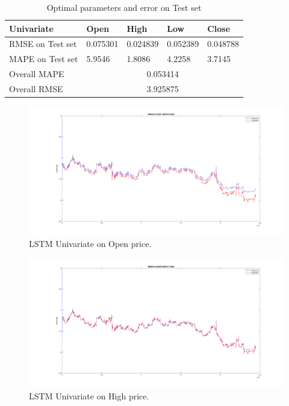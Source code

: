\documentclass[11pt]{article}
\begin{document}
\begin{table}[H]
  \centering
\begin{tabular}{|l|l|l|l|l|}
  \hline
  Univariate       & Open        & High       & Low        & Close      \\ \hline
  RMSE on Test set & 0.075301    & 0.024839   & 0.052389   & 0.048788   \\ \hline
  MAPE on Test set & 5.9546      & 1.8086     & 4.2258     & 3.7145     \\ \hline
  Overall MAPE     & \multicolumn{4}{c|}{0.053414}                      \\ \hline
  Overall RMSE     & \multicolumn{4}{c|}{3.925875}                      \\ \hline
\end{tabular}
\caption{Optimal parameters and error on Test set}
\end{table}

\begin{figure}[H]
  \centering
  \includegraphics[width=\textwidth,keepaspectratio]{figs/lstm_uni_open.png}
  \caption{LSTM Univariate on Open price.}
\end{figure}

\begin{figure}[H]
  \centering
  \includegraphics[width=\linewidth,keepaspectratio]{figs/lstm_uni_high.png}
  \caption{LSTM Univariate on High price.}
\end{figure}
\end{document}
